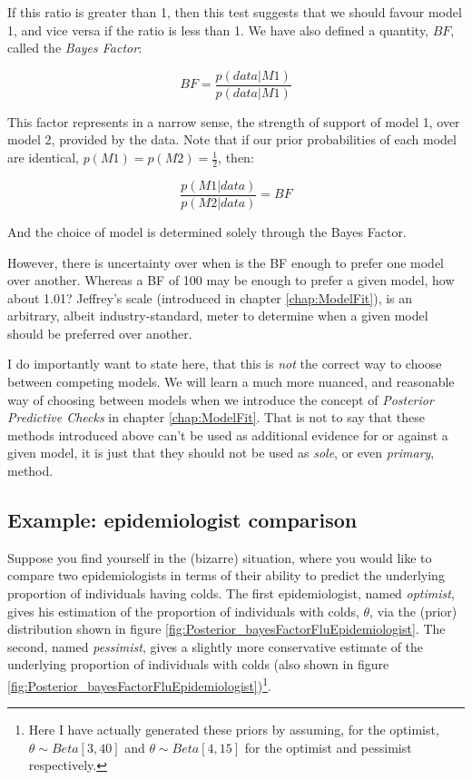 \documentclass[11pt,fullpage]{book}
\begin{document}
If this ratio is greater than 1, then this test suggests that we should favour model 1, and vice versa if the ratio is less than 1. We have also defined a quantity, $BF$, called the \textit{Bayes Factor}:

\begin{equation}\label{eq:Posterior_bayesFactorDefinition}
BF = \frac{p(data|M1)}{p(data|M1)}
\end{equation}

This factor represents in a narrow sense, the strength of support of model 1, over model 2, provided by the data. Note that if our prior probabilities of each model are identical, $p(M1) = p(M2) = \frac{1}{2}$, then:

\begin{equation}
\frac{p(M1|data)}{p(M2|data)} = BF
\end{equation}

And the choice of model is determined solely through the Bayes Factor. 

However, there is uncertainty over when is the BF enough to prefer one model over another. Whereas a BF of 100 may be enough to prefer a given model, how about 1.01? Jeffrey's scale (introduced in chapter \ref{chap:ModelFit}), is an arbitrary, albeit industry-standard, meter to determine when a given model should be preferred over another.

I do importantly want to state here, that this is \textit{not} the correct way to choose between competing models. We will learn a much more nuanced, and reasonable way of choosing between models when we introduce the concept of \textit{Posterior Predictive Checks} in chapter \ref{chap:ModelFit}. That is not to say that these methods introduced above can't be used as additional evidence for or against a given model, it is just that they should not be used as \textit{sole}, or even \textit{primary}, method.

\subsection{Example: epidemiologist comparison}
Suppose you find yourself in the (bizarre) situation, where you would like to compare two epidemiologists in terms of their ability to predict the underlying proportion of individuals having colds. The first epidemiologist, named \textit{optimist}, gives his estimation of the proportion of individuals with colds, $\theta$, via the (prior) distribution shown in figure \ref{fig:Posterior_bayesFactorFluEpidemiologist}. The second, named \textit{pessimist}, gives a slightly more conservative estimate of the underlying proportion of individuals with colds (also shown in figure \ref{fig:Posterior_bayesFactorFluEpidemiologist})\footnote{Here I have actually generated these priors by assuming, for the optimist, $\theta\sim Beta[3,40]$ and $\theta\sim Beta[4,15]$ for the optimist and pessimist respectively.}.
\end{document}
